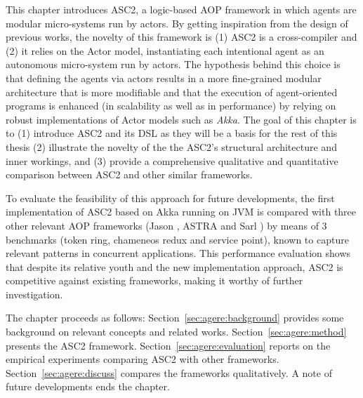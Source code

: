 

 

This chapter introduces ASC2, a logic-based AOP framework in which agents are modular micro-systems run by actors. By getting inspiration from the design of previous works, the novelty of this framework is (1) ASC2 is a cross-compiler and (2) it relies on the Actor model, instantiating each intentional agent as an autonomous micro-system run by actors. The hypothesis behind this choice is that defining the agents via actors results in a more fine-grained modular architecture that is more modifiable and that the execution of agent-oriented programs is enhanced (in scalability as well as in performance) by relying on robust implementations of Actor models such as \textit{Akka}. The goal of this chapter is to (1) introduce ASC2 and its DSL as they will be a basis for the rest of this thesis (2) illustrate the novelty of the the ASC2's structural architecture and inner workings, and (3) provide a comprehensive qualitative and quantitative comparison between ASC2 and other similar frameworks.

To evaluate the feasibility of this approach for future developments, the first implementation of ASC2 based on Akka running on JVM is compared with three other relevant AOP frameworks (Jason \cite{Bordini2005}, ASTRA \cite{Astra} and Sarl \cite{Astra}) by means of 3 benchmarks (token ring, chameneos redux and service point), known to capture relevant patterns in concurrent applications. This performance evaluation shows that despite its relative youth and the new implementation approach, ASC2 is competitive against existing frameworks, making it worthy of further investigation.

The chapter proceeds as follows: Section~\ref{sec:agere:background} provides some background on relevant concepts and related works. Section~\ref{sec:agere:method} presents the ASC2 framework. Section~\ref{sec:agere:evaluation} reports on the empirical experiments comparing ASC2 with other frameworks. Section~\ref{sec:agere:discuss} compares the frameworks qualitatively. A note of future developments ends the chapter.


